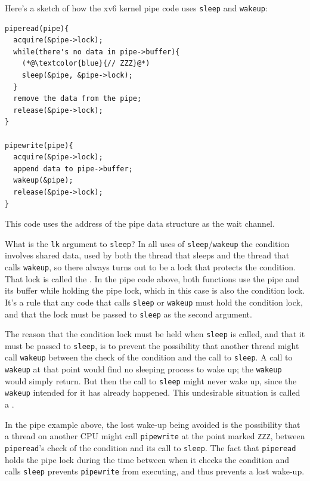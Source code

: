 Here's a sketch of how the xv6 kernel pipe code uses
\lstinline{sleep} and \lstinline{wakeup}:

\begin{lstlisting}
piperead(pipe){
  acquire(&pipe->lock);
  while(there's no data in pipe->buffer){
    (*@\textcolor{blue}{// ZZZ}@*)
    sleep(&pipe, &pipe->lock);
  }
  remove the data from the pipe;
  release(&pipe->lock);
}

pipewrite(pipe){
  acquire(&pipe->lock);
  append data to pipe->buffer;
  wakeup(&pipe);
  release(&pipe->lock);
}
\end{lstlisting}

This code uses the address of the pipe data structure as
the wait channel.

What is the \lstinline{lk} argument to \lstinline{sleep}?
In all uses of \lstinline{sleep}/\lstinline{wakeup}
the condition involves shared data, used by both the
thread that sleeps and the thread that calls \lstinline{wakeup}, so
there always turns out to be a lock that protects the condition. That lock is
called the . In the pipe code above, both
functions use the pipe and its buffer while holding the pipe lock,
which in this case is also the condition lock. It's a rule that any code
that calls \lstinline{sleep} or \lstinline{wakeup} must hold the
condition lock, and that the lock must be passed to \lstinline{sleep}
as the second argument.

The reason that the condition lock must be held when \lstinline{sleep}
is called, and that it must be passed to \lstinline{sleep}, is to
prevent the possibility that another thread might call
\lstinline{wakeup} between the check of the condition 
and the call to \lstinline{sleep}. A call to
\lstinline{wakeup} at that point would find no sleeping process to
wake up; the \lstinline{wakeup} would simply return.
But then the call to \lstinline{sleep} might never wake up,
since the \lstinline{wakeup} intended for it has already happened.
This undesirable situation is called a .

In the pipe example above, the lost wake-up being avoided is the
possibility that a thread on another CPU might call \lstinline{pipewrite}
at the point marked {\tt ZZZ},
between \lstinline{piperead}'s check of the condition and its call to
\lstinline{sleep}. The fact that \lstinline{piperead} holds the pipe
lock during the time between when it checks the condition and calls
\lstinline{sleep} prevents \lstinline{pipewrite} from executing, and
thus prevents a lost wake-up.

